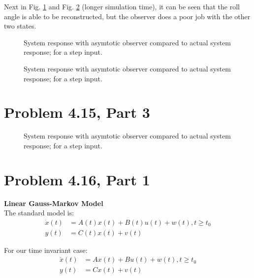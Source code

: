 \documentclass[paper=a4, fontsize=11pt]{scrartcl}
\numberwithin{equation}{section}		%
\numberwithin{figure}{section}			%
\numberwithin{table}{section}				%
\begin{document}


Next in Fig. \ref{fig:f3} and Fig. \ref{fig:f4} (longer simulation time), it can be seen that the roll angle is able to be reconstructed, but the observer does a poor job with the other two states.

\begin{figure}[!htb]
	\centering
    
	\caption{System response with asymtotic observer compared to actual system response; for a step input. \label{fig:f3}}
\end{figure}

\begin{figure}[!]
	\centering
    
	\caption{System response with asymtotic observer compared to actual system response; for a step input. \label{fig:f4}}
\end{figure}

\section*{Problem 4.15, Part 3}


\begin{figure}[!htb]
	\centering
    
	\caption{System response with asymtotic observer compared to actual system response; for a step input. \label{fig:f5}}
\end{figure}

\section*{Problem 4.16, Part 1}

\textbf{Linear Gauss-Markov Model} \\
The standard model is:
\begin{align}
\dot{x}(t)&=A(t)x(t)+B(t)u(t)+w(t), t \geq t_0\\
y(t)&=C(t)x(t)+v(t)
\end{align}

For our time invariant case:
\begin{align}
\dot{x}(t)&=Ax(t)+Bu(t)+w(t), t \geq t_0\\
y(t)&=Cx(t)+v(t)
\end{align}
\end{document}
